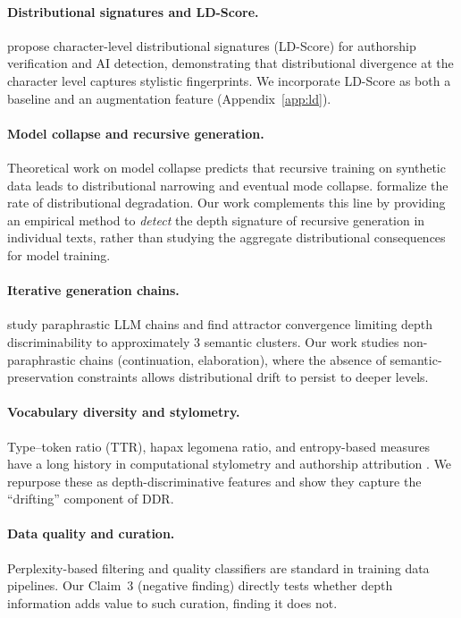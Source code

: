 \documentclass[11pt,a4paper]{article}
\begin{document}
\paragraph{Distributional signatures and LD-Score.}
\citet{tulchinskii2024ldscore} propose character-level distributional signatures (LD-Score) for authorship verification and AI detection, demonstrating that distributional divergence at the character level captures stylistic fingerprints. We incorporate LD-Score as both a baseline and an augmentation feature (Appendix~\ref{app:ld}).

\paragraph{Model collapse and recursive generation.}
Theoretical work on model collapse \citep{shumailov2024modelcollapse} predicts that recursive training on synthetic data leads to distributional narrowing and eventual mode collapse.
\citet{dohmatob2024collapse} formalize the rate of distributional degradation.
Our work complements this line by providing an empirical method to \emph{detect} the depth signature of recursive generation in individual texts, rather than studying the aggregate distributional consequences for model training.

\paragraph{Iterative generation chains.}
\citet{briesch2025llmbrokenphone} study paraphrastic LLM chains and find attractor convergence limiting depth discriminability to approximately 3 semantic clusters. Our work studies non-paraphrastic chains (continuation, elaboration), where the absence of semantic-preservation constraints allows distributional drift to persist to deeper levels.

\paragraph{Vocabulary diversity and stylometry.}
Type--token ratio (TTR), hapax legomena ratio, and entropy-based measures have a long history in computational stylometry and authorship attribution \citep{tweedie1998variable}. We repurpose these as depth-discriminative features and show they capture the ``drifting'' component of DDR.

\paragraph{Data quality and curation.}
Perplexity-based filtering \citep{wenzek2019ccnet} and quality classifiers are standard in training data pipelines. Our Claim~3 (negative finding) directly tests whether depth information adds value to such curation, finding it does not.
\end{document}
